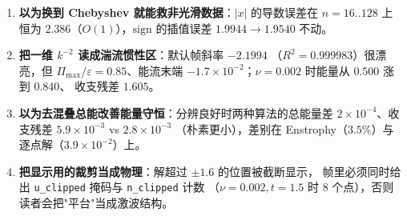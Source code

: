 \begin{enumerate}
        （	exttt{lo=128}）在 $t=0.6/1.0$ 给 $-1.60/-1.33$（$R^2=0.09/0.06$）——
        两个窗口都不可信。斜率必须与窗口、$R^2$、用点数一起报。
  \item \textbf{以为换到 Chebyshev 就能救非光滑数据}：$|x|$ 的导数误差在
        $n=16..128$ 上恒为 $2.386$（$O(1)$），$\mathrm{sign}$ 的插值误差
        $1.9944\to1.9540$ 不动。
  \item \textbf{把一维 $k^{-2}$ 读成湍流惯性区}：默认帧斜率 $-2.1994$
        （$R^2=0.999983$）很漂亮，但 $\Pi_{\max}/\varepsilon=0.85$、能流末端
        $-1.7\times10^{-2}$；$\nu=0.002$ 时能量从 $0.500$ 涨到 $0.840$、
        收支残差 $1.605$。
  \item \textbf{以为去混叠总能改善能量守恒}：分辨良好时两种算法的总能量差
        $2\times10^{-4}$、收支残差 $5.9\times10^{-3}$ vs $2.8\times10^{-3}$
        （朴素更小），差别在 Enstrophy（$3.5\%$）与逐点解（$3.9\times10^{-2}$）上。
  \item \textbf{把显示用的裁剪当成物理}：解超过 $\pm1.6$ 的位置被截断显示，
        帧里必须同时给出 \texttt{u\_clipped} 掩码与 \texttt{n\_clipped} 计数
        （$\nu=0.002,t=1.5$ 时 $8$ 个点），否则读者会把"平台"当成激波结构。
\end{enumerate}
